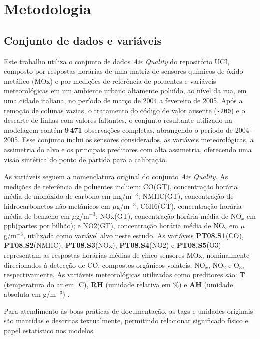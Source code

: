 \section{Metodologia}
\label{sec:metodologia}

\subsection{Conjunto de dados e variáveis}
\label{subsec:dataset}

Este trabalho utiliza o conjunto de dados \textit{Air Quality} do repositório UCI, composto por respostas horárias de uma matriz de sensores químicos de óxido metálico (MOx) e por medições de referência de poluentes e variáveis meteorológicas em um ambiente urbano altamente poluído, ao nível da rua, em uma cidade italiana, no período de março de 2004 a fevereiro de 2005. Após a remoção de colunas vazias, o tratamento do código de valor ausente (\texttt{-200}) e o descarte de linhas com valores faltantes, o conjunto resultante utilizado na modelagem contém \textbf{9\,471} observações completas, abrangendo o período de 2004–2005. Esse conjunto inclui os sensores considerados, as variáveis meteorológicas, a assimetria do alvo e os principais preditores com alta assimetria, oferecendo uma visão sintética do ponto de partida para a calibração.

As variáveis seguem a nomenclatura original do conjunto \textit{Air Quality}. As medições de referência de poluentes incluem: CO(GT), concentração horária média de monóxido de carbono em mg/m$^{-3}$; NMHC(GT), concentração de hidrocarbonetos não metânicos em $\mu$g/m$^{-3}$; C6H6(GT), concentração horária média de benzeno em $\mu$g/m$^{-3}$; NOx(GT), concentração horária média de NO$_x$ em ppb(partes por bilhão); e NO2(GT), concentração horária média de NO$_2$ em $\mu$g/m$^{-3}$, utilizada como variável alvo neste estudo. As variáveis \textbf{PT08.S1}(CO), \textbf{PT08.S2}(NMHC), \textbf{PT08.S3}(NOx), \textbf{PT08.S4}(NO2) e \textbf{PT08.S5}(O3) representam as respostas horárias médias de cinco sensores MOx, nominalmente direcionados à detecção de CO, compostos orgânicos voláteis, NO$_x$, NO$_2$ e O$_3$, respectivamente. As variáveis meteorológicas utilizadas como preditores são: \textbf{T} (temperatura do ar em $^\circ$C), \textbf{RH} (umidade relativa em \%) e \textbf{AH} (umidade absoluta em g/m$^{-3}$) \cite{devito2008}.

Para atendimento às boas práticas de documentação, as tags e unidades originais são mantidas e descritas textualmente, permitindo relacionar significado físico e papel estatístico nos modelos.

